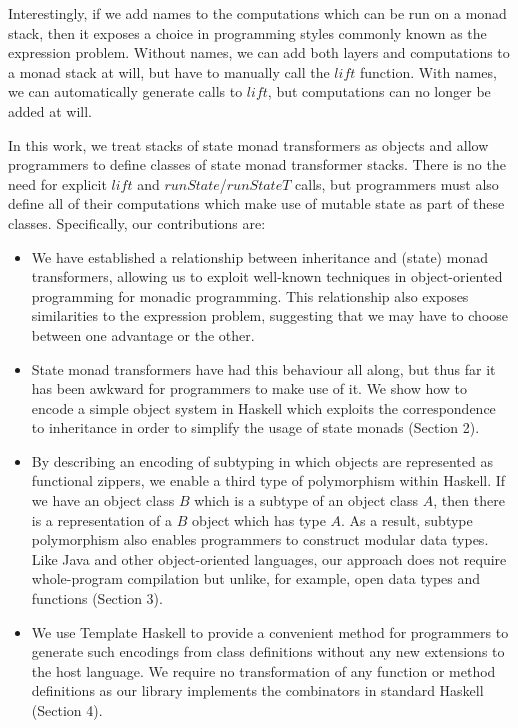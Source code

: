 Interestingly, if we add names to the computations which can be run on a monad stack, then it exposes a choice in programming styles commonly known as the expression problem\cite{wadler1998expression}. Without names, we can add both layers and computations to a monad stack at will, but have to manually call the $\mathit{lift}$ function. With names, we can automatically generate calls to $\mathit{lift}$, but computations can no longer be added at will.

In this work, we treat stacks of state monad transformers as objects and allow programmers to define classes of state monad transformer stacks. There is no the need for explicit $\mathit{lift}$ and $\mathit{runState}$/$\mathit{runStateT}$ calls, but programmers must also define all of their computations which make use of mutable state as part of these classes. Specifically, our contributions are:
\begin{itemize}
    \item We have established a relationship between inheritance and (state) monad transformers, allowing us to exploit well-known techniques in object-oriented programming for monadic programming. This relationship also exposes similarities to the expression problem, suggesting that we may have to choose between one advantage or the other.
    \item State monad transformers have had this behaviour all along, but thus far it has been awkward for programmers to make use of it. We show how to encode a simple object system in Haskell which exploits the correspondence to inheritance in order to simplify the usage of state monads (Section 2).
    \item By describing an encoding of subtyping in which objects are represented as functional zippers, we enable a third type of polymorphism within Haskell. If we have an object class $B$ which is a subtype of an object class $A$, then there is a representation of a $B$ object which has type $A$. As a result, subtype polymorphism also enables programmers to construct modular data types. Like Java and other object-oriented languages, our approach does not require whole-program compilation but unlike, for example, open data types and functions\cite{loh2006open} (Section 3).
    \item We use Template Haskell to provide a convenient method for programmers to generate such encodings from class definitions without any new extensions to the host language. We require no transformation of any function or method definitions as our library implements the combinators in standard Haskell (Section 4).
\end{itemize}

\pagebreak